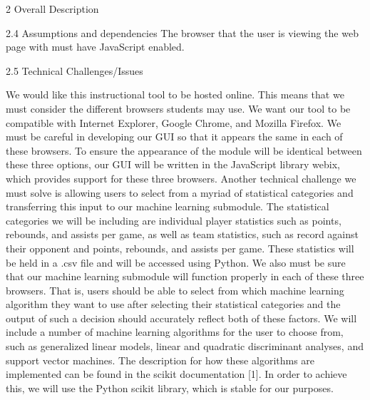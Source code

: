 \documentclass[letterpaper, 10pt,titlepage]{article}
\begin{document}
\begin{section}{2 Overall Description}
\begin{subsection}{2.4 Assumptions and dependencies}
The browser that the user is viewing the web page with must have JavaScript enabled.
\end{subsection}

\begin{subsection}{2.5 Technical Challenges/Issues}


We would like this instructional tool to be hosted online. This means that we must consider the different browsers students may use. We want our tool to be compatible with Internet Explorer, Google Chrome, and Mozilla Firefox. We must be careful in developing our GUI so that it appears the same in each of these browsers. To ensure the appearance of the module will be identical between these three options, our GUI will be written in the JavaScript library webix, which provides support for these three browsers. Another technical challenge we must solve is allowing users to select from a myriad of statistical categories and transferring this input to our machine learning submodule. The statistical categories we will be including are individual player statistics such as points, rebounds, and assists per game, as well as team statistics, such as record against their opponent and points, rebounds, and assists per game. These statistics will be held in a .csv file and will be accessed using Python. We also must be sure that our machine learning submodule will function properly in each of these three browsers. That is, users should be able to select from which machine learning algorithm they want to use after selecting their statistical categories and the output of such a decision should accurately reflect both of these factors. We will include a number of machine learning algorithms for the user to choose from, such as generalized linear models, linear and quadratic discriminant analyses, and support vector machines. The description for how these algorithms are implemented can be found in the scikit documentation [1]. In order to achieve this, we will use the Python scikit library, which is stable for our purposes.  

\end{subsection}
\end{section}
\end{document}
